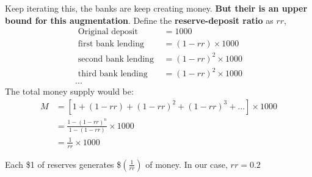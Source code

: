 \documentclass[12pt]{article}
\begin{document}
Keep iterating this, the banks are keep creating money. {\textbf {But their is an
upper bound for this augmentation}}. Define the {\textbf {reserve-deposit ratio}} as 
$ rr $,
\begin{align*}
\text{ Original deposit } &= 1000\\
\text{ first bank lending }  &= (1 - rr) \times 1000\\
\text{ second bank lending }  &= (1 - rr)^{2} \times 1000\\
\text{ third bank lending }  &= (1 - rr)^{2} \times 1000\\
...
\end{align*}
The total money supply would be:
\begin{align*}
M &= \left[ 1 + (1 - rr) + (1 - rr)^{2} + (1 - rr)^{3} + ... \right]  \times 1000\\
	&= \frac{1 - (1 - rr)^{n}}{1 - (1 - rr)}  \times 1000\\
	&= \frac{1}{rr} \times 1000
\end{align*}

Each \$1 of reserves generates \$$ (\frac{1}{rr}) $ of money. In our case, $ rr = 0.2 $











%
%
\end{document}
